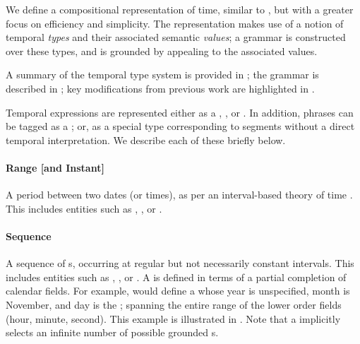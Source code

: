 We define a compositional representation of time, similar to \me, but with
  a greater focus on efficiency and simplicity.
The representation makes use of a notion of temporal \textit{types} and
  their associated semantic \textit{values};
  a grammar is constructed over these types, and is grounded by appealing
  to the associated values.

A summary of the temporal type system is provided in ;
  the grammar is described in ;
  key modifications from previous work are highlighted in .

Temporal expressions are represented either as a , ,
	or .
In addition, phrases can be tagged as a ; or, as a
  special  type corresponding to segments 
  without a direct temporal interpretation.
We describe each of these briefly below.

\paragraph{Range [and Instant]}
A period between two dates (or times), as per an interval-based theory of
  time \cite{key:1981allen-temporal}.
This includes entities such as , , or
	.


\paragraph{Sequence}
A sequence of s, occurring at regular but not necessarily constant
  intervals.
This includes entities such as , , or
	.
A  is defined in terms of a partial completion of calendar fields.
For example,  would define a  whose
  year is unspecified,
  month is November, and day is the ; spanning the entire range of the
  lower order fields (hour, minute, second).
This example is illustrated in .
Note that a  implicitly selects an infinite number of possible 
  grounded s.

